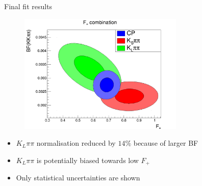 \documentclass{beamer}
\begin{document}
\begin{frame}{Final fit results}
  \begin{figure}
    \centering
    \includegraphics[width=0.7\textwidth]{Plots/FPlus_contours.png}
  \end{figure}
  \begin{itemize}
    \item{$K_L\pi\pi$ normalisation reduced by $14\%$ because of larger BF}
    \item{$K_L\pi\pi$ is potentially biased towards low $F_+$}
    \item{Only statistical uncertainties are shown}
  \end{itemize}
\end{frame}
\end{document}
